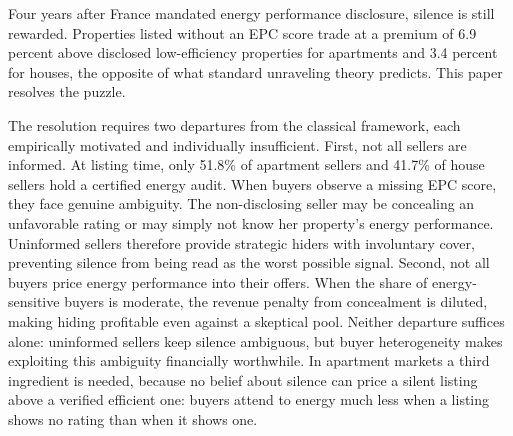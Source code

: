 \documentclass[10pt,letterpaper]{bp-template-concise}
\begin{document}
Four years after France mandated energy performance disclosure, silence is still rewarded. Properties listed without an EPC score trade at a premium of 6.9 percent above disclosed low-efficiency properties for apartments and 3.4 percent for houses, the opposite of what standard unraveling theory predicts. This paper resolves the puzzle.

The resolution requires two departures from the classical framework, each empirically motivated and individually insufficient. First, not all sellers are informed. At listing time, only 51.8\% of apartment sellers and 41.7\% of house sellers hold a certified energy audit. When buyers observe a missing EPC score, they face genuine ambiguity. The non-disclosing seller may be concealing an unfavorable rating or may simply not know her property's energy performance. Uninformed sellers therefore provide strategic hiders with involuntary cover, preventing silence from being read as the worst possible signal. Second, not all buyers price energy performance into their offers. When the share of energy-sensitive buyers is moderate, the revenue penalty from concealment is diluted, making hiding profitable even against a skeptical pool. Neither departure suffices alone: uninformed sellers keep silence ambiguous, but buyer heterogeneity makes exploiting this ambiguity financially worthwhile. In apartment markets a third ingredient is needed, because no belief about silence can price a silent listing above a verified efficient one: buyers attend to energy much less when a listing shows no rating than when it shows one. %
\end{document}
